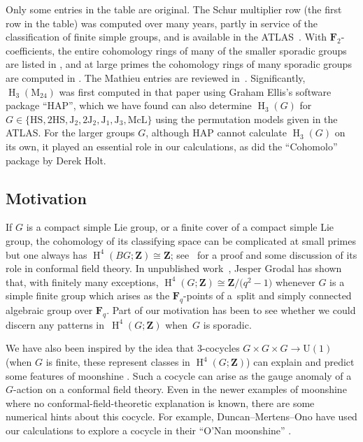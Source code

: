 \documentclass[pdftex]{sigma}
\numberwithin{equation}{section}
\newcommand\bF{\mathbf F}
\newcommand\bZ{\mathbf Z}
\newcommand\rM{\mathrm M}
\DeclareMathOperator\homology{H}
\renewcommand\H{\homology}
\newcommand\<\langle
\renewcommand\>\rangle
\begin{document}
Only some entries in the table are original. The Schur multiplier row (the first row in the table) was computed over many years, partly in service of the classification of finite simple groups, and is available in the ATLAS~\cite{ATLAS}.
With $\bF_2$-coefficients, the entire cohomology rings of many of the smaller sporadic groups are listed in \cite{MR2035696},
{and at large primes the cohomology rings of many sporadic groups are computed in \cite{CBThomasI,CBThomasII}}.
The Mathieu entries are reviewed in~\cite{SE09}. Significantly,
$\H_3(\rM_{24})$ was first computed in that paper using Graham Ellis's software package ``HAP'', which we have found can also determine $\H_3(G)$ for $G \in \{\mathrm{HS},2\mathrm{HS},\mathrm{J}_2, 2\mathrm{J}_2, \mathrm{J}_1,\mathrm{J}_3,\mathrm{McL}\}$ using the permutation models given in the ATLAS.
For the larger groups $G$, although HAP cannot calculate $\H_3(G)$ on its own, it played an essential role in our calculations, as did the ``Cohomolo'' package by Derek Holt.

\subsection{Motivation}\label{intro:motivation}
If $G$ is a compact simple Lie group, or a finite cover of a compact simple Lie group, the cohomology of its classifying space can be complicated at small primes but one always has $\H^4(BG;\bZ) \cong \bZ$; see~\cite{HenriquesWZW} for a proof and some discussion of its role in conformal field theory. In unpublished work~\cite{Grodal}, Jesper Grodal has shown that, with finitely many exceptions, $\H^4(G;\bZ) \cong \bZ/\big(q^2-1\big)$ whenever $G$ is a simple finite group which arises as the $\bF_q$-points of a~split and simply connected algebraic group over $\bF_q$. Part of our motivation has been to see whether we could discern any patterns in~$\H^4(G;\bZ)$ when~$G$ is sporadic.

We have also been inspired by the idea that $3$-cocycles $G \times G \times G \to \mathrm{U}(1)$ (when $G$ is finite, these represent classes in $\H^4(G;\bZ)$) can explain and predict some features of moonshine \cite{CLW, GPRV,MR3539377,MR2500561}. Such a cocycle can arise as the gauge anomaly of a~$G$-action on a conformal field theory. Even in the newer examples of moonshine where no conformal-field-theoretic explanation is known, there are some numerical hints about this cocycle. For example, Duncan--Mertens--Ono have used our calculations to explore a cocycle in their ``O'Nan moonshine'' \cite[Section~3]{DMO1}.
\end{document}
